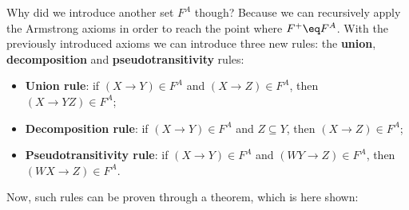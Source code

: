Why did we introduce another set $F^A$ though? Because we can recursively apply the Armstrong axioms in order to reach the point where $F^+ \eq F^A$. With the previously introduced axioms we can introduce three new rules: the \textbf{union}, \textbf{decomposition} and \textbf{pseudotransitivity} rules:
\begin{itemize}
    \item \textbf{Union rule}: if $(X \rightarrow Y) \in F^A$ and $(X \rightarrow Z) \in F^A$, then $(X \rightarrow YZ) \in F^A$;
    \item \textbf{Decomposition rule}: if $(X \rightarrow Y) \in F^A$ and $Z \subseteq Y$, then $(X \rightarrow Z) \in F^A$;
    \item \textbf{Pseudotransitivity rule}: if $(X \rightarrow Y) \in F^A$ and $(WY \rightarrow Z) \in F^A$, then $(WX \rightarrow Z) \in F^A$.
\end{itemize} 

Now, such rules can be proven through a theorem, which is here shown:


